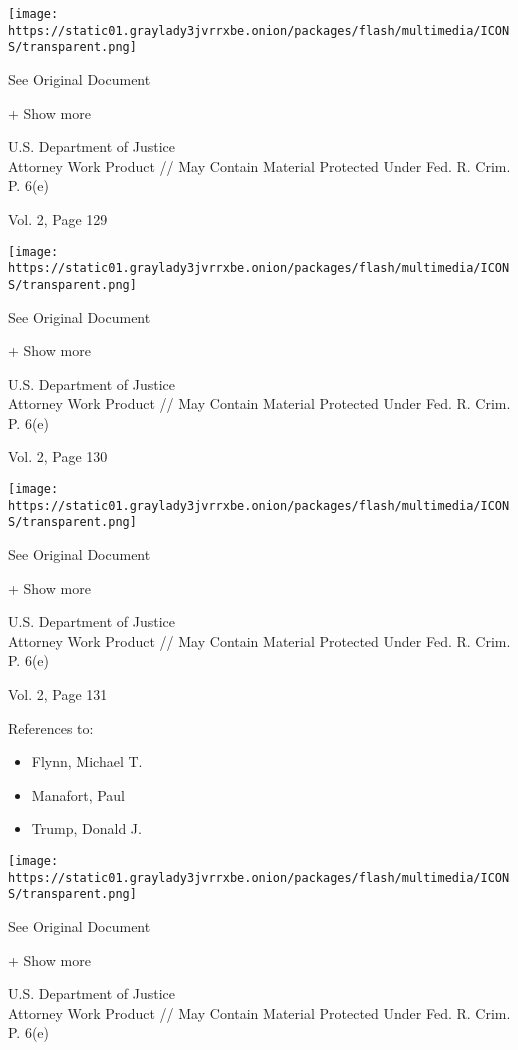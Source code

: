 \protect\hyperlink{}{}

\texttt{[image: https://static01.graylady3jvrrxbe.onion/packages/flash/multimedia/ICONS/transparent.png]}

See Original Document

+ Show more

U.S. Department of Justice\\
Attorney Work Product // May Contain Material Protected Under Fed. R.
Crim. P. 6(e)

Vol. 2, Page 129

\protect\hyperlink{}{}

\texttt{[image: https://static01.graylady3jvrrxbe.onion/packages/flash/multimedia/ICONS/transparent.png]}

See Original Document

+ Show more

U.S. Department of Justice\\
Attorney Work Product // May Contain Material Protected Under Fed. R.
Crim. P. 6(e)

Vol. 2, Page 130

\protect\hyperlink{}{}

\texttt{[image: https://static01.graylady3jvrrxbe.onion/packages/flash/multimedia/ICONS/transparent.png]}

See Original Document

+ Show more

U.S. Department of Justice\\
Attorney Work Product // May Contain Material Protected Under Fed. R.
Crim. P. 6(e)

Vol. 2, Page 131

References to:

\begin{itemize}
\tightlist
\item
  Flynn, Michael T.
\item
  Manafort, Paul 
\item
  Trump, Donald J.
\end{itemize}

\protect\hyperlink{}{}

\texttt{[image: https://static01.graylady3jvrrxbe.onion/packages/flash/multimedia/ICONS/transparent.png]}

See Original Document

+ Show more

U.S. Department of Justice\\
Attorney Work Product // May Contain Material Protected Under Fed. R.
Crim. P. 6(e)

